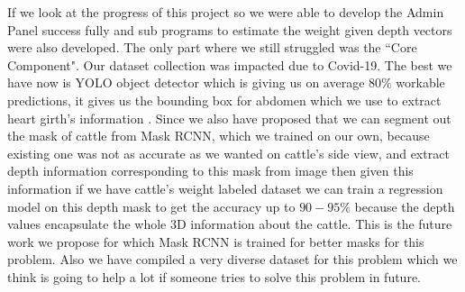 If we look at the progress of this project so we were able to develop the Admin Panel success fully and sub programs to estimate the weight given depth vectors were also developed. The only part where we still struggled was the ``Core Component". Our dataset collection was impacted due to Covid-19. The best we have now is YOLO object detector which is giving us on average \(80\%\) workable predictions, it gives us the bounding box for abdomen which we use to extract heart girth's information . Since we also have proposed that we can segment out the mask of cattle from Mask RCNN, which we trained on our own, because existing one was not as accurate as we wanted on cattle's side view, and extract depth information corresponding to this mask from image then given this information if we have cattle's weight labeled dataset we can train a regression model on this depth mask to get the accuracy up to \(90-95\%\) because the depth values encapsulate the whole 3D information about the cattle. This is the future work we propose for which Mask RCNN is trained for better masks for this problem. Also we have compiled a very diverse dataset for this problem which we think is going to help a lot if someone tries to solve this problem in future. 
